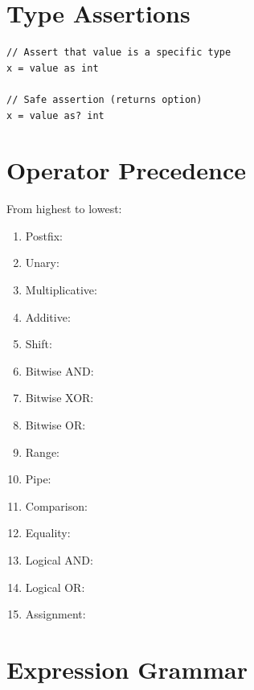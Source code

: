 \section{Type Assertions}

\begin{lstlisting}
// Assert that value is a specific type
x = value as int

// Safe assertion (returns option)
x = value as? int
\end{lstlisting}

\section{Operator Precedence}

From highest to lowest:

\begin{enumerate}
    \item Postfix: \code{()} \code{[]}  
    \item Unary: \code{!} \code{-} \code{\~{}} 
    \item Multiplicative: \code{*} \code{/} \code{\%}
    \item Additive: \code{+} \code{-}
    \item Shift: \code{<<} \code{>>} \code{>>>}
    \item Bitwise AND: \code{\&}
    \item Bitwise XOR: \code{\^{}}
    \item Bitwise OR: \code{|}
    \item Range:  
    \item Pipe: \code{|>}
    \item Comparison: \code{<} \code{>} \code{<=} \code{>=}
    \item Equality: \code{==} \code{!=}
    \item Logical AND:  \code{\&\&}
    \item Logical OR:  \code{||}
    \item Assignment: \code{=} \code{+=} \code{-=} \code{*=} \code{/=} \code{\&=} \code{|=} \code{\^{}=} \code{<<=} \code{>>=} \code{>>>=}
\end{enumerate}

\section{Expression Grammar}

